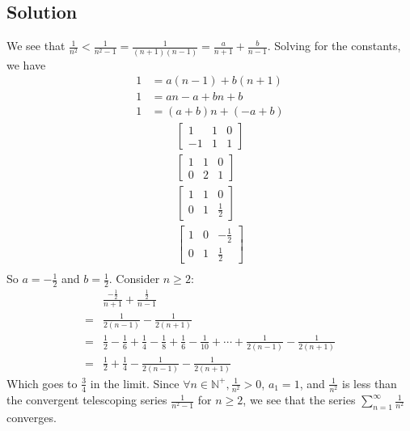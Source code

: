 \documentclass[12pt]{article}
\newcommand{\N}    [0]{\mathbb{N}                   }
\begin{document}
\subsection*{Solution}
We see that $\frac{1}{n^2} < \frac{1}{n^2 - 1} = \frac{1}{(n+1)(n-1)} = \frac{a}{n+1} + \frac{b}{n-1}$. Solving for the constants, we have
\begin{align*}
    1 &= a(n-1) + b(n+1) \\
    1 &= an - a + bn + b \\
    1 &= (a+b)n + (-a + b)
\end{align*}
\begin{align*}
    \begin{bmatrix}
        1 & 1 & 0 \\
        -1 & 1 & 1
    \end{bmatrix}\\
    \begin{bmatrix}
        1 & 1 & 0 \\
        0 & 2 & 1
    \end{bmatrix} \\
    \begin{bmatrix}
        1 & 1 & 0 \\
        0 & 1 & \frac{1}{2}
    \end{bmatrix} \\
    \begin{bmatrix}
        1 & 0 & -\frac{1}{2} \\
        0 & 1 & \frac{1}{2}
    \end{bmatrix} \\
\end{align*}
So $a = -\frac{1}{2}$ and $b = \frac{1}{2}$. Consider $n \geq 2$:
\begin{align*}
     & \frac{-\frac{1}{2}}{n+1} + \frac{\frac{1}{2}}{n-1} \\
    =& \frac{1}{2(n-1)} - \frac{1}{2(n+1)} \\
    =& \frac{1}{2} - \frac{1}{6} + \frac{1}{4} - \frac{1}{8} + \frac{1}{6} - \frac{1}{10} + \cdots + \frac{1}{2(n-1)} - \frac{1}{2(n+1)} \\
    =& \frac{1}{2} + \frac{1}{4} - \frac{1}{2(n-1)} - \frac{1}{2(n+1)}
\end{align*}
Which goes to $\frac{3}{4}$ in the limit. Since $\forall n \in \N^+, \frac{1}{n^2} > 0$, $a_1 = 1$, and $\frac{1}{n^2}$ is less than the convergent telescoping series $\frac{1}{n^2 - 1}$ for $n \geq 2$, we see that the series $\sum_{n=1}^\infty \frac{1}{n^2}$ converges.
\end{document}
